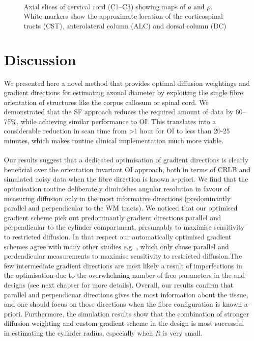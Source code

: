 \begin{figure}[ht]
	\centering
	\\	
	\caption{Axial slices of cervical cord (C1--C3) showing maps of $a$ and $\rho$. White markers show the approximate location of the corticospinal tracts (CST), anterolateral column (ALC) and dorsal column (DC)}
	\label{fig:chapter7 exp1 monkey data}
\end{figure}

\section{Discussion}
We presented here a novel method that provides optimal diffusion weightings and gradient directions for estimating axonal diameter by exploiting the single fibre orientation of structures like the corpus callosum or spinal cord. We demonstrated that the {\gls{SF}} approach reduces the required amount of data by 60--75\%, while achieving similar performance to {\gls{OI}}. This translates into a considerable reduction in scan time from >1 hour for {\gls{OI}} to less than 20-25 minutes, which makes routine clinical implementation much more viable.  

\paragraph{}
Our results suggest that a dedicated optimisation of gradient directions is clearly beneficial over the orientation invariant \gls{OI}{} approach, both in terms of CRLB and simulated noisy data when the fibre direction is known a-priori. We find that the optimisation routine deliberately diminishes angular resolution in favour of measuring diffusion only in the most informative directions (predominantly parallel and perpendicular to the WM tracts). We noticed that our optimised gradient scheme pick out predominantly gradient directions parallel and perpendicular to the cylinder compartment, presumably to maximise sensitivity to restricted diffusion. In that respect our automatically optimised gradient schemes agree with many other studies e.g. \citep{Stanisz:1997,Avram:2008,Assaf:2008,Panagiotaki:2012}, which only chose parallel and perdendicular measurements to maximise sensitivity to restricted diffusion.The few intermediate gradient directions are most likely a result of imperfections in the optimisation due to the overwhelming number of free parameters in the \FD{} and \DO{} designs (see next chapter for more details). Overall, our results confirm that parallel and perpendicuar directions gives the most information about the tissue, and one should focus on those directions when the fibre configuration is known a-priori. Furthermore, the simulation results show that the combination of stronger diffusion weighting and custom gradient scheme in the \FD{} design is most successful in estimating the cylinder radius, especially when $R$ is very small.


